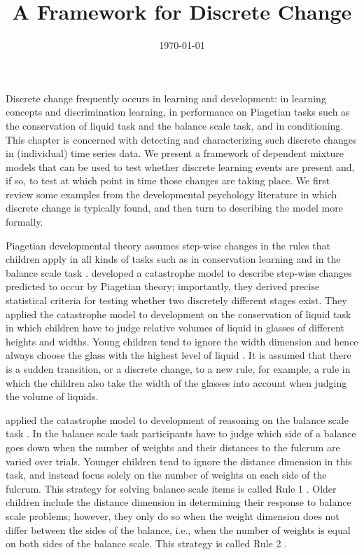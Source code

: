 \documentclass[a4paper,12pt,man]{apa} %
\title{A Framework for Discrete Change}
\date{\today}
\newcommand{\citep}{\cite}
\newcommand{\citet}{\citeA}
\begin{document}
\maketitle

Discrete change frequently occurs in learning and development: in
learning concepts and discrimination learning, in performance on
Piagetian tasks such as the conservation of liquid task and the
balance scale task, and in conditioning.  This chapter is concerned
with detecting and characterizing such discrete changes in
(individual) time series data.  We present a framework of dependent
mixture models that can be used to test whether discrete learning
events are present and, if so, to test at which point in time those
changes are taking place.  We first review some examples from the
developmental psychology literature in which discrete change is
typically found, and then turn to describing the model more formally.

Piagetian developmental theory assumes step-wise changes in the rules
that children apply in all kinds of tasks such as in conservation
learning and in the balance scale task \citep{Siegler2005}.
\citet{Maas1992} developed a catastrophe model to describe step-wise
changes predicted to occur by Piagetian theory; importantly, they
derived precise statistical criteria for testing whether two
discretely different stages exist.  They applied the catastrophe model
to development on the conservation of liquid task \citep{Inhelder1958}
in which children have to judge relative volumes of liquid in glasses
of different heights and widths.  Young children tend to ignore the
width dimension and hence always choose the glass with the highest
level of liquid \citep{Inhelder1958}.  It is assumed that there is a
sudden transition, or a discrete change, to a new rule, for example, a
rule in which the children also take the width of the glasses into
account when judging the volume of liquids.

\citet{Jansen2001b} applied the catastrophe model to development of
reasoning on the balance scale task \citep{Siegler1981}.  In the
balance scale task participants have to judge which side of a balance
goes down when the number of weights and their distances to the
fulcrum are varied over trials.  Younger children tend to ignore the
distance dimension in this task, and instead focus solely on the
number of weights on each side of the fulcrum.  This strategy for
solving balance scale items is called Rule 1 \citep{Siegler1981}.
Older children include the distance dimension in determining their
response to balance scale problems; however, they only do so when the
weight dimension does not differ between the sides of the balance,
i.e., when the number of weights is equal on both sides of the balance
scale.  This strategy is called Rule 2 \cite{Siegler1981}.
\end{document}
